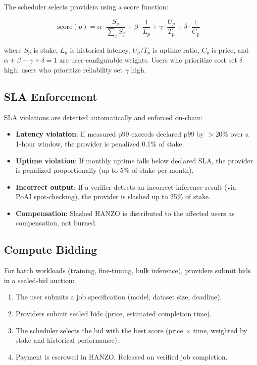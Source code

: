 \documentclass[11pt]{article}
\begin{document}
The scheduler selects providers using a score function:

\begin{equation}
\text{score}(p) = \alpha \cdot \frac{S_p}{\sum_j S_j} +
\beta \cdot \frac{1}{L_p} + \gamma \cdot \frac{U_p}{T_p} +
\delta \cdot \frac{1}{C_p}
\end{equation}

where $S_p$ is stake, $L_p$ is historical latency, $U_p/T_p$ is uptime ratio,
$C_p$ is price, and $\alpha + \beta + \gamma + \delta = 1$ are
user-configurable weights. Users who prioritize cost set $\delta$ high; users
who prioritize reliability set $\gamma$ high.

\subsection{SLA Enforcement}

SLA violations are detected automatically and enforced on-chain:

\begin{itemize}[leftmargin=1.1em]
    \item \textbf{Latency violation}: If measured p99 exceeds declared p99 by
    $>$20\% over a 1-hour window, the provider is penalized 0.1\% of stake.
    \item \textbf{Uptime violation}: If monthly uptime falls below declared
    SLA, the provider is penalized proportionally (up to 5\% of stake per
    month).
    \item \textbf{Incorrect output}: If a verifier detects an incorrect
    inference result (via PoAI spot-checking), the provider is slashed up
    to 25\% of stake.
    \item \textbf{Compensation}: Slashed HANZO is distributed to the affected
    users as compensation, not burned.
\end{itemize}

\subsection{Compute Bidding}

For batch workloads (training, fine-tuning, bulk inference), providers submit
bids in a sealed-bid auction:

\begin{enumerate}[leftmargin=1.4em]
    \item The user submits a job specification (model, dataset size, deadline).
    \item Providers submit sealed bids (price, estimated completion time).
    \item The scheduler selects the bid with the best score (price $\times$
    time, weighted by stake and historical performance).
    \item Payment is escrowed in HANZO. Released on verified job completion.
\end{enumerate}
\end{document}
